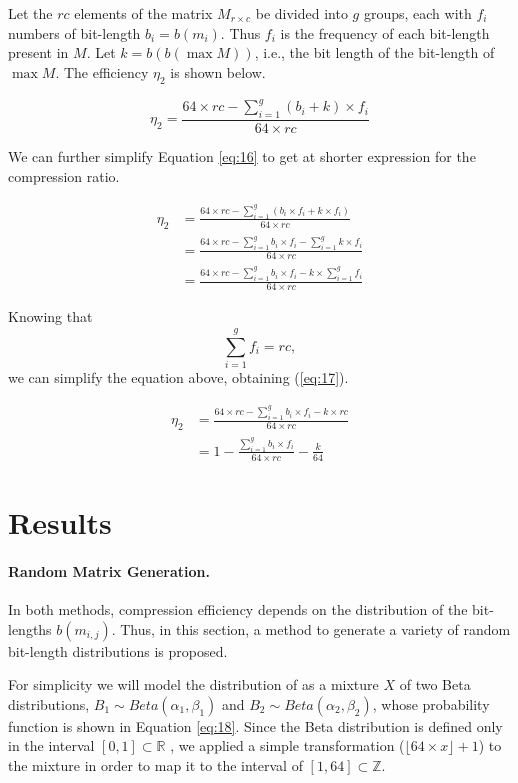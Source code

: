 \documentclass[10pt]{article}
\begin{document}
Let the $rc$ elements of the matrix $M_{r \times c}$ be divided into $g$ groups, each with $f_i$ numbers of bit-length $b_i = b(m_i)$. Thus $f_i$ is the frequency of each bit-length present in $M$. Let $k = b(b(\max M))$, i.e., the bit length of the bit-length of $\max M$. The efficiency $\eta_2$ is shown below.

\begin{equation}\label{eq:16}
 \eta_2 = \frac{64 \times rc - \sum_{i=1}^{g} ( b_i + k ) \times f_i }{64 \times rc} 
\end{equation}

We can further simplify Equation \ref{eq:16} to get at shorter expression for the compression ratio.

\begin{align}
 \eta_2 &= \frac{64 \times rc - \sum_{i=1}^{g} ( b_i \times f_i + k \times f_i )}{64 \times rc} \nonumber \\
  &= \frac{64 \times rc - \sum_{i=1}^{g}  b_i \times f_i  -\sum_{i=1}^{g}  k \times f_i }{64 \times rc}\nonumber \\
  &= \frac{64 \times rc - \sum_{i=1}^{g}  b_i \times f_i  - k \times\sum_{i=1}^{g}  f_i }{64 \times rc}\nonumber 
\end{align}
  
 Knowing that $$\sum_{i=1}^{g} f_i = rc, $$ we can simplify the equation above, obtaining (\ref{eq:17}).
 
\begin{align}\label{eq:17}
 \eta_2 &= \frac{64 \times rc - \sum_{i=1}^{g}  b_i \times f_i  - k \times rc }{64 \times rc}\nonumber \\
  &= 1 - \frac{\sum_{i=1}^{g}  b_i \times f_i }{64 \times rc} - \frac{k}{64}
\end{align}

\section*{Results}

\paragraph{Random Matrix Generation.}
In both methods, compression efficiency depends on the distribution of the bit-lengths $b(m_{i,j})$. Thus, in this section, a method to generate a variety of random bit-length distributions is proposed.

For simplicity we will model the distribution of  as a mixture $X$ of two Beta distributions, $B_1 \sim Beta(\alpha_1,\beta_1)$ and $B_2 \sim Beta(\alpha_2,\beta_2)$, whose probability function is shown in Equation \ref{eq:18}. Since the Beta distribution is defined only in the interval $[0,1] \subset \mathbb{R}$ , we applied a simple transformation ($\lfloor 64 \times x \rfloor + 1$) to the mixture in order to map it to the interval of $[1,64] \subset \mathbb{Z}$.
\end{document}
